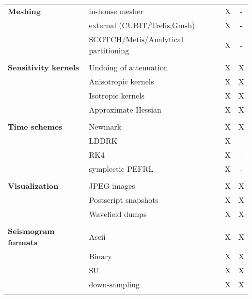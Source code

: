 \begin{table}[htp]
\begin{center}
\begin{tabular}{ l l c c}
{\bf Meshing}           & in-house mesher                       & X  & - \\
                        & external (CUBIT/Trelis,Gmsh)          & X  & - \\
                        & SCOTCH/Metis/Analytical partitioning  & X  & - \\
\hline
& & & \\
{\bf Sensitivity kernels} & Undoing of attenuation          & X  & X \\
                          & Anisotropic kernels             & X  & X \\
                          & Isotropic kernels               & X  & X \\
                          & Approximate Hessian             & X  & X \\
\hline
& & & \\
{\bf Time schemes}  & Newmark           & X  & X \\
                    & LDDRK             & X  & - \\
                    & RK4               & X  & - \\
                    & symplectic PEFRL  & X  & - \\
\hline
& & & \\
{\bf Visualization} & JPEG images          & X  & X \\
                    & Postscript snapshots & X  & X \\
                    & Wavefield dumps      & X  & X \\
\hline
& & & \\
{\bf Seismogram formats}  & Ascii          & X  & X \\
                          & Binary         & X  & X \\
                          & SU             & X  & X \\
                          & down-sampling  & X  & X \\
%
\hline
& & & \\ %
\end{tabular}
\end{center}
\end{table}


